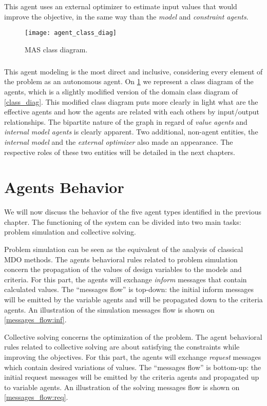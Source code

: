 This agent uses an external optimizer to estimate input values that would improve the objective, in the same way than the \emph{model} and \emph{constraint agents}.

\begin{figure}
\texttt{[image: agent\_class\_diag]}
\caption{MAS class diagram.}\label{MAS_class_diagram}
\end{figure}

\paragraph*{}
This agent modeling is the most direct and inclusive, considering every element of the problem as an autonomous agent. On \figurename{} \ref{MAS_class_diagram} we represent a class diagram of the agents, which is a slightly modified version of the domain class diagram of \figurename{} \ref{class_diag}. This modified class diagram puts more clearly in light what are the effective agents and how the agents are related with each others by input/output relationships. The bipartite nature of the graph in regard of \emph{value agents} and \emph{internal model agents} is clearly apparent. Two additional, non-agent entities, the \emph{internal model} and the \emph{external optimizer} also made an appearance. The respective roles of these two entities will be detailed in the next chapters.

\chapter{Agents Behavior}\label{agent_behav_chap}

We will now discuss the behavior of the five agent types identified in the previous chapter. The functioning of the system can be divided into two main tasks: problem simulation and collective solving.

Problem simulation can be seen as the equivalent of the analysis of classical MDO methods. The agents behavioral rules related to problem simulation concern the propagation of the values of design variables to the models and criteria. For this part, the agents will exchange \emph{inform} messages that contain calculated values. The \enquote{messages flow} is top-down: the initial inform messages will be emitted by the variable agents and will be propagated down to the criteria agents. An illustration of the simulation messages flow is shown on \figurename{} \ref{messages_flow:inf}.

Collective solving concerns the optimization of the problem. The agent behavioral rules related to collective solving are about satisfying the constraints while improving the objectives. For this part, the agents will exchange \emph{request} messages which contain desired variations of values. The \enquote{messages flow} is bottom-up: the initial request messages will be emitted by the criteria agents and propagated up to variable agents. An illustration of the solving messages flow is shown on \figurename{} \ref{messages_flow:req}.

